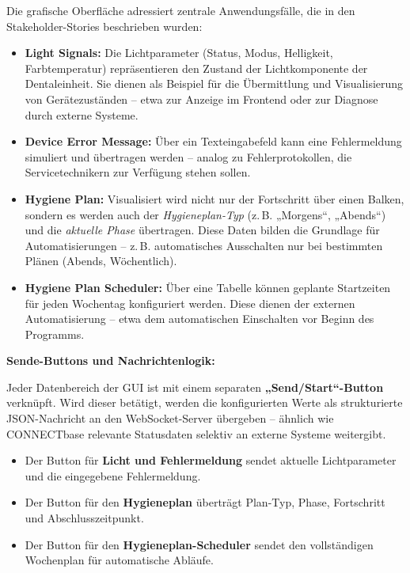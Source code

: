 Die grafische Oberfläche adressiert zentrale Anwendungsfälle, die in den Stakeholder-Stories beschrieben wurden:

\begin{itemize}
  \item \textbf{Light Signals:} Die Lichtparameter (Status, Modus, Helligkeit, Farbtemperatur) repräsentieren den Zustand der Lichtkomponente der Dentaleinheit. Sie dienen als Beispiel für die Übermittlung und Visualisierung von Gerätezuständen – etwa zur Anzeige im Frontend oder zur Diagnose durch externe Systeme.\\
  
  \item \textbf{Device Error Message:} Über ein Texteingabefeld kann eine Fehlermeldung simuliert und übertragen werden – analog zu Fehlerprotokollen, die Servicetechnikern zur Verfügung stehen sollen.\\
  
  \item \textbf{Hygiene Plan:} Visualisiert wird nicht nur der Fortschritt über einen Balken, sondern es werden auch der \textit{Hygieneplan-Typ} (z.\,B. „Morgens“, „Abends“) und die \textit{aktuelle Phase} übertragen. Diese Daten bilden die Grundlage für Automatisierungen – z.\,B. automatisches Ausschalten nur bei bestimmten Plänen (Abends, Wöchentlich).\\
  
  \item \textbf{Hygiene Plan Scheduler:} Über eine Tabelle können geplante Startzeiten für jeden Wochentag konfiguriert werden. Diese dienen der externen Automatisierung – etwa dem automatischen Einschalten vor Beginn des Programms.
\end{itemize}


\textbf{\large Sende-Buttons und Nachrichtenlogik:}

Jeder Datenbereich der GUI ist mit einem separaten \textbf{„Send/Start“-Button} verknüpft. Wird dieser betätigt, werden die konfigurierten Werte als strukturierte JSON-Nachricht an den WebSocket-Server übergeben – ähnlich wie CONNECTbase relevante Statusdaten selektiv an externe Systeme weitergibt.

\begin{itemize}
  \item Der Button für \textbf{Licht und Fehlermeldung} sendet aktuelle Lichtparameter und die eingegebene Fehlermeldung.\\
  \item Der Button für den \textbf{Hygieneplan} überträgt Plan-Typ, Phase, Fortschritt und Abschlusszeitpunkt.\\
  \item Der Button für den \textbf{Hygieneplan-Scheduler} sendet den vollständigen Wochenplan für automatische Abläufe.
\end{itemize}

